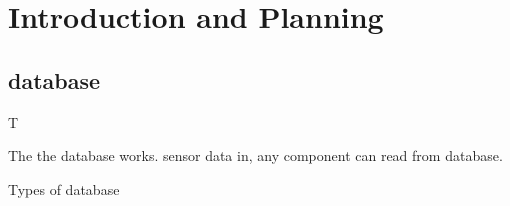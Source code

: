 \section{Introduction and Planning}

\subsection{database}
T

The the database works. sensor data in, any component can read from database.

Types of database